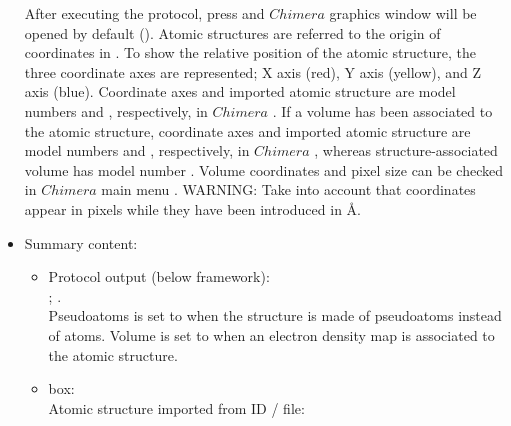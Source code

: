 \begin{itemize}
  After executing the protocol, press  and $Chimera$ graphics window will be opened by default (). 
  Atomic structures are referred to the origin of coordinates in \chimera. To show the relative position of the atomic structure, the three coordinate axes are represented; X axis (red), Y axis (yellow), and Z axis (blue). Coordinate axes and imported atomic structure are model numbers  and , respectively, in $Chimera$ . If a volume has been associated to the atomic structure, coordinate axes and imported atomic structure are model numbers  and , respectively, in $Chimera$ , whereas structure-associated volume has model number . Volume coordinates and pixel size can be checked in $Chimera$ main menu . WARNING: Take into account that coordinates appear in pixels while they have been introduced in \AA.
   
   \item Summary content:
    \begin{itemize}
     \item Protocol output (below \scipion framework):\\ ; .\\Pseudoatoms is set to  when the structure is made of pseudoatoms instead of atoms. Volume is set to  when an electron density map is associated to the atomic structure.
     \item {} box:\\Atomic structure imported from ID / file: 
    \end{itemize}

  \end{itemize}
